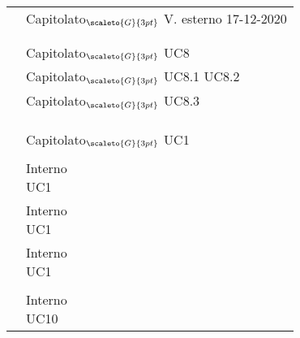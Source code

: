 {{{{\def\tabularxcolumn#1{m{#1}}
{
	\begin{center}
		\renewcommand{\arraystretch}{1.4}
		\begin{longtable}{|p{7.5cm}|p{7.5cm}|}
		\hline
		\rowcolor{airforceblue}
		\makecell[tc]{\textbf{Codice RS}} & \makecell[c]{\textbf{Fonte}}  \\
		\hline
		\makecell[tc]{RSFO1} & \makecell[tc]{Capitolato$_{\scaleto{G}{3pt}}$\\V. esterno 17-12-2020} \\
		\hline
		\makecell[tc]{RSFF2} & \makecell[tc]{Capitolato$_{\scaleto{G}{3pt}}$}\\
		\hline
		\makecell[tc]{RSFO3} & \makecell[tc]{UC2}\\
		\hline
		\makecell[tc]{RSFO4} & \makecell[tc]{Capitolato$_{\scaleto{G}{3pt}}$\\UC8}\\
		\hline
		\makecell[tc]{RSFO4.1} & \makecell[tc]{Capitolato$_{\scaleto{G}{3pt}}$\\UC8.1 \\ UC8.2}\\
		\hline
		\makecell[tc]{RSFO4.2} & \makecell[tc]{Capitolato$_{\scaleto{G}{3pt}}$\\UC8.3}\\
		\hline
		\makecell[tc]{RSFO5} & \makecell[tc]{Capitolato$_{\scaleto{G}{3pt}}$}\\
		\hline
		\makecell[tc]{RSFD5.1} & \makecell[tc]{Capitolato$_{\scaleto{G}{3pt}}$}\\
		\hline
		\makecell[tc]{RSFD6}& \makecell[tc]{Capitolato$_{\scaleto{G}{3pt}}$}\\
		\hline
		\makecell[tc]{RSFO7} & \makecell[tc]{Capitolato$_{\scaleto{G}{3pt}}$\\UC1}\\
		\hline
		\makecell[tc]{RSFO8} & \makecell[tc]{Interno}\\
		\hline
		\makecell[tc]{RSFO9} & \makecell[tc]{Interno \\ UC1}\\
		\hline
		\makecell[tc]{RSFO10} & \makecell[tc]{Interno \\ UC1}\\
		\hline
		\makecell[tc]{RSFO11} & \makecell[tc]{Interno \\ UC1}\\
		\hline
		\makecell[tc]{RSFF12} & \makecell[tc]{Interno}\\
		\hline
		\makecell[tc]{RSFD13} & \makecell[tc]{Interno \\ UC10}\\

\end{longtable}
\end{center}}}}}}
